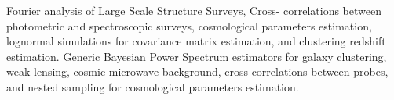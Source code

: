 

\begin{cvparagraph}

\begin{cvskills}
    {
     Fourier analysis of Large Scale Structure Surveys, Cross- correlations between photometric and spectroscopic surveys, cosmological parameters estimation, lognormal simulations for covariance matrix estimation, and clustering redshift estimation.
    }
    {
      Generic Bayesian Power Spectrum estimators for galaxy clustering, weak lensing, cosmic microwave background, cross-correlations between probes, and nested sampling for cosmological parameters estimation.
    }
\end{cvskills}



\end{cvparagraph}